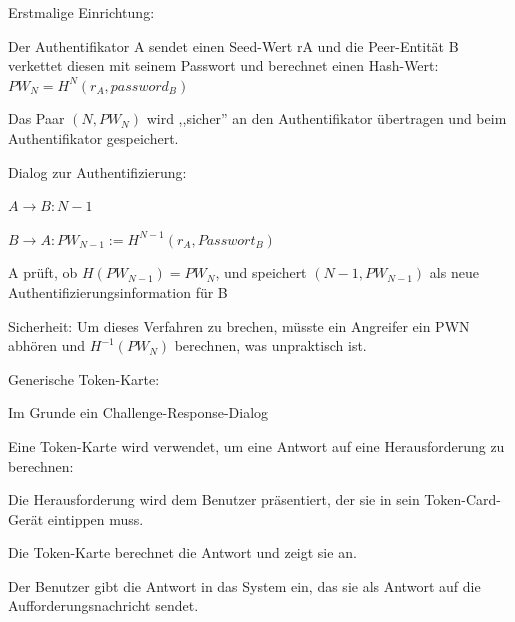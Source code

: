 \documentclass[a4paper]{article}
\begin{document}
\begin{multicols}{3}
\begin{itemize*}
\begin{itemize*}
                  \item Erstmalige Einrichtung:
                  \begin{itemize*}
                        \item Der Authentifikator A sendet einen Seed-Wert rA und die Peer-Entität B verkettet diesen mit seinem Passwort und berechnet einen Hash-Wert: $PW_N = H^N(r_A, password_B)$
                        \item Das Paar $(N, PW_N)$ wird ,,sicher'' an den Authentifikator übertragen und beim Authentifikator gespeichert.
                  \end{itemize*}
                  \item Dialog zur Authentifizierung:
                  \begin{itemize*}
                        \item $A\rightarrow B: N - 1$
                        \item $B\rightarrow A: PW_{N-1} := H^{N-1}(r_A, Passwort_B)$
                        \item A prüft, ob $H(PW_{N-1}) = PW_N$, und speichert $(N-1, PW_{N-1})$ als neue Authentifizierungsinformation für B
                  \end{itemize*}
                  \item Sicherheit: Um dieses Verfahren zu brechen, müsste ein Angreifer ein PWN abhören und $H^{-1}(PW_N)$ berechnen, was unpraktisch ist.
            \end{itemize*}
            \item Generische Token-Karte:
            \begin{itemize*}
                  \item Im Grunde ein Challenge-Response-Dialog
                  \item Eine Token-Karte wird verwendet, um eine Antwort auf eine Herausforderung zu berechnen:
                  \begin{itemize*}
                        \item Die Herausforderung wird dem Benutzer präsentiert, der sie in sein Token-Card-Gerät eintippen muss.
                        \item Die Token-Karte berechnet die Antwort und zeigt sie an.
                        \item Der Benutzer gibt die Antwort in das System ein, das sie als Antwort auf die Aufforderungsnachricht sendet.
                  \end{itemize*}
            \end{itemize*}

\end{itemize*}
\end{multicols}
\end{document}
